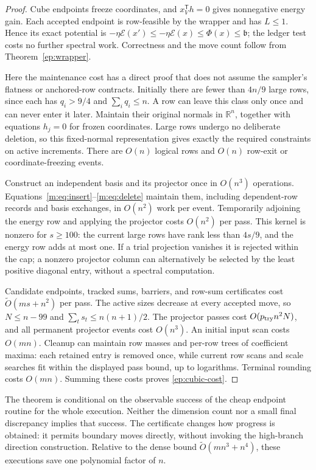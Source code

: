 \documentclass[11pt]{amsart}
\theoremstyle{definition}\newtheorem{definition}[theorem]{Definition}
\theoremstyle{remark}\newtheorem{remark}[theorem]{Remark}
\numberwithin{equation}{section}
\newcommand{\R}{\mathbb R}
\newcommand{\T}{\mathsf T}
\begin{document}
\begin{proof}
Cube endpoints freeze coordinates, and $x_V^\T h=0$ gives
nonnegative energy gain. Each accepted endpoint is row-feasible by
the wrapper and has $L\le1$. Hence its exact potential is
$-\eta\mathcal E(x')\le-\eta\mathcal E(x)\le\Phi(x)\le\mathfrak b$;
the ledger test costs no further spectral work. Correctness and the
move count follow from Theorem~\ref{ep:wrapper}.

Here the maintenance cost has a direct proof that does not assume the
sampler's flatness or anchored-row contracts. Initially there are fewer
than $4n/9$ large rows, since each has $q_i>9/4$ and
$\sum_iq_i\le n$. A row can leave this class only once and can never
enter it later. Maintain their original normals in $\R^n$, together
with equations $h_j=0$ for frozen coordinates. Large rows undergo no
deliberate deletion, so this fixed-normal representation gives exactly
the required constraints on active increments. There are $O(n)$
logical rows and $O(n)$ row-exit or coordinate-freezing events.

Construct an independent basis and its projector once in $O(n^3)$
operations. Equations~\eqref{m:eq:insert}--\eqref{m:eq:delete} maintain
them, including dependent-row records and basis exchanges, in $O(n^2)$
work per event. Temporarily adjoining the energy row and applying the
projector costs $O(n^2)$ per pass. This kernel is nonzero for $s\ge100$:
the current large rows have rank less than $4s/9$, and the energy row
adds at most one. If a trial projection vanishes it is rejected within
the cap; a nonzero projector column can alternatively be selected by
the least positive diagonal entry, without a spectral computation.

Candidate endpoints, tracked sums, barriers, and row-sum certificates
cost $\widetilde O(ms+n^2)$ per pass. The active sizes decrease at
every accepted move, so $N\le n-99$ and
$\sum_t s_t\le n(n+1)/2$. The projector passes cost
$O(p_{\rm try}n^2N)$, and all permanent projector events cost $O(n^3)$.
An initial input scan costs $O(mn)$. Cleanup can maintain row masses
and per-row trees of coefficient maxima: each retained entry is removed
once, while current row scans and scale searches fit within the
displayed pass bound, up to logarithms. Terminal rounding costs
$O(mn)$. Summing these costs proves \eqref{ep:cubic-cost}.
\end{proof}

The theorem is conditional on the observable success of the cheap
endpoint routine for the whole execution. Neither the dimension count
nor a small final discrepancy implies that success. The certificate
changes how progress is obtained: it permits boundary moves directly,
without invoking the high-branch direction construction. Relative to
the dense bound $\widetilde O(mn^3+n^4)$, these executions save one
polynomial factor of $n$.
\end{document}
